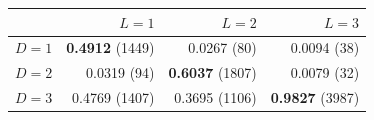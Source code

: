 \begin{tabular}{lrrr}
\toprule
 & $L=1$ & $L=2$ & $L=3$ \\
\midrule
$D=1$ & \textbf{0.4912} (1449) & 0.0267 (80) & 0.0094 (38) \\
$D=2$ & 0.0319 (94) & \textbf{0.6037} (1807) & 0.0079 (32) \\
$D=3$ & 0.4769 (1407) & 0.3695 (1106) & \textbf{0.9827} (3987) \\
\bottomrule
\end{tabular}
